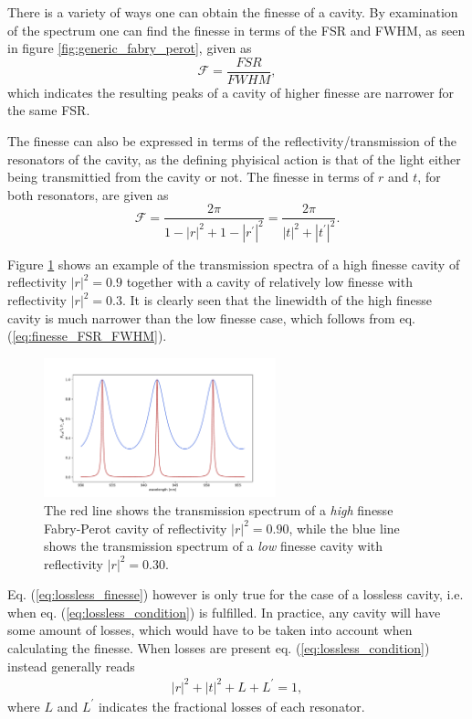 There is a variety of ways one can obtain the finesse of a cavity. By examination of the spectrum one can find the finesse in terms of the FSR and FWHM, as seen in figure \ref{fig:generic_fabry_perot}, given as
\begin{equation}
    \mathcal{F} = \frac{FSR}{FWHM},
    \label{eq:finesse_FSR_FWHM}
\end{equation}
which indicates the resulting peaks of a cavity of higher finesse are narrower for the same FSR.

The finesse can also be expressed in terms of the reflectivity/transmission of the resonators of the cavity, as the defining phyisical action is that of the light either being transmittied from the cavity or not. The finesse in terms of $r$ and $t$, for both resonators, are given as
\begin{equation}
    \mathcal{F} = \frac{2 \pi}{1 - |r|^2 + 1 - |r^{\prime}|^2} = \frac{2 \pi}{|t|^2+|t^{\prime}|^2}.
    \label{eq:lossless_finesse}
\end{equation}

Figure \ref{fig:fabry_perot_trans} shows an example of the transmission spectra of a high finesse cavity of reflectivity $|r|^2 = 0.9$ together with a cavity of relatively low finesse with reflectivity $|r|^2 = 0.3$. It is clearly seen that the linewidth of the high finesse cavity is much narrower than the low finesse case, which follows from eq. (\ref{eq:finesse_FSR_FWHM}).

\begin{figure}[h!]
    \centering
    \includegraphics[width=0.6\textwidth]{figures/fabry_perot_high_and_low_finesse.pdf}
    \caption{The red line shows the transmission spectrum of a \emph{high} finesse Fabry-Perot cavity of reflectivity $|r|^2 = 0.90$, while the blue line shows the transmission spectrum of a \emph{low} finesse cavity with reflectivity $|r|^2 = 0.30$.}
    \label{fig:fabry_perot_trans}
\end{figure}


Eq. (\ref{eq:lossless_finesse}) however is only true for the case of a lossless cavity, i.e. when eq. (\ref{eq:lossless_condition}) is fulfilled. In practice, any cavity will have some amount of losses, which would have to be taken into account when calculating the finesse. When losses are present eq. (\ref{eq:lossless_condition}) instead generally reads
\begin{eqnarray}
    |r|^2 + |t|^2 + L + L^{\prime} = 1,
\end{eqnarray}
where $L$ and $L^{\prime}$ indicates the fractional losses of each resonator.

